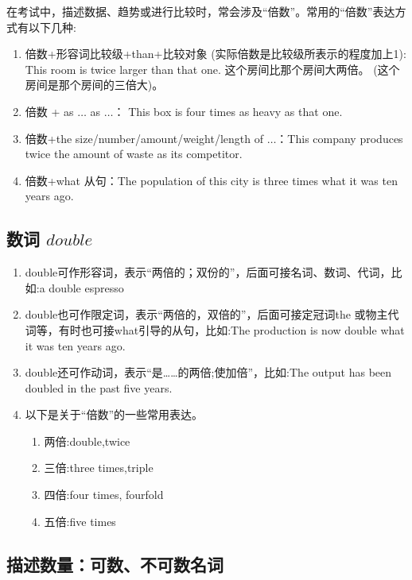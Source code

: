 在考试中，描述数据、趋势或进行比较时，常会涉及“倍数”。常用的“倍数”表达方式有以下几种:
\begin{enumerate}
  \item 倍数+形容词比较级+than+比较对象 (实际倍数是比较级所表示的程度加上1): This room is twice larger than that one. 这个房间比那个房间大两倍。 (这个房间是那个房间的三倍大)。
  \item 倍数 + as \(\ldots\) as \(\ldots\)： This box is four times as heavy as that one.
  \item 倍数+the size/number/amount/weight/length of \(\ldots\)：This company produces twice the amount of waste as its competitor.
  \item 倍数+what 从句：The population of this city is three times what it was ten years ago.
\end{enumerate}
\subsection{数词 \(double\)}

\begin{enumerate}
  \item double可作形容词，表示“两倍的；双份的”，后面可接名词、数词、代词，比如:a double espresso
  \item double也可作限定词，表示“两倍的，双倍的”，后面可接定冠词the 或物主代词等，有时也可接what引导的从句，比如:The production is now double what it was ten
        years ago.
  \item double还可作动词，表示“是……的两倍;使加倍”，比如:The output has been doubled in the past five years.
  \item 以下是关于“倍数”的一些常用表达。
        \begin{enumerate}
          \item 两倍:double,twice
          \item 三倍:three times,triple
          \item 四倍:four times, fourfold
          \item 五倍:five times
        \end{enumerate}
\end{enumerate}

\subsection{描述数量：可数、不可数名词}


